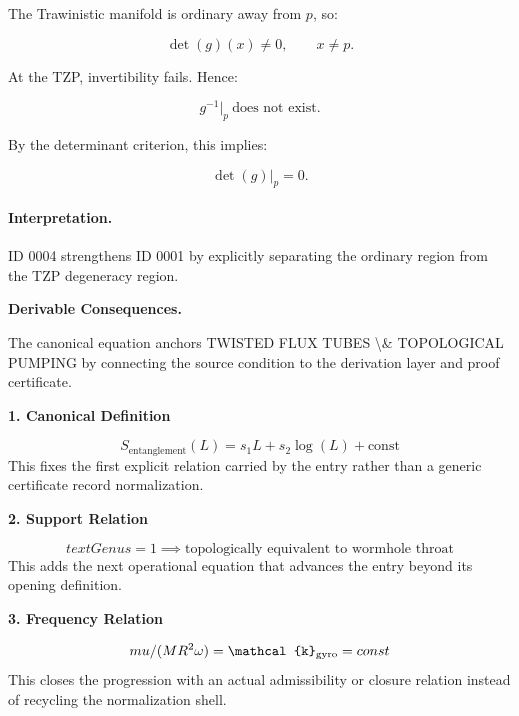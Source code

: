 The Trawinistic manifold is ordinary away from $p$, so:

\begin{equation}
\det(g)(x)\neq 0,
\qquad x\neq p .
\end{equation}

At the TZP, invertibility fails. Hence:

\begin{equation}
g^{-1}\big|_p \ \text{does not exist}.
\end{equation}

By the determinant criterion, this implies:

\begin{equation}
\det(g)\big|_p=0 .
\end{equation}

\paragraph{Interpretation.}
ID 0004 strengthens ID 0001 by explicitly separating the ordinary region from the TZP degeneracy region.

\par\vspace{0.35em}
\noindent\textbf{Derivable Consequences.}\quad
\begingroup
\footnotesize
\raggedright
The canonical equation anchors TWISTED FLUX TUBES \textbackslash{}\& TOPOLOGICAL PUMPING by connecting the source condition to the derivation layer and proof certificate.
\par\endgroup

\noindent\textbf{1. Canonical Definition}\par
\[
S_{\text{entanglement}}(L) = s_1 L + s_2 \log(L) + \text{const}
\]
\noindent This fixes the first explicit relation carried by the entry rather than a generic certificate record normalization.\par
\noindent\textbf{2. Support Relation}\par
\[
text{Genus} = 1 \implies \text{topologically equivalent to wormhole throat}
\]
\noindent This adds the next operational equation that advances the entry beyond its opening definition.\par
\noindent\textbf{3. Frequency Relation}\par
\[
mu/(M R\textsuperscript{2} \omega) = \mathcal{k}_{\mathrm{gyro}} = const
\]
\noindent This closes the progression with an actual admissibility or closure relation instead of recycling the normalization shell.\par

